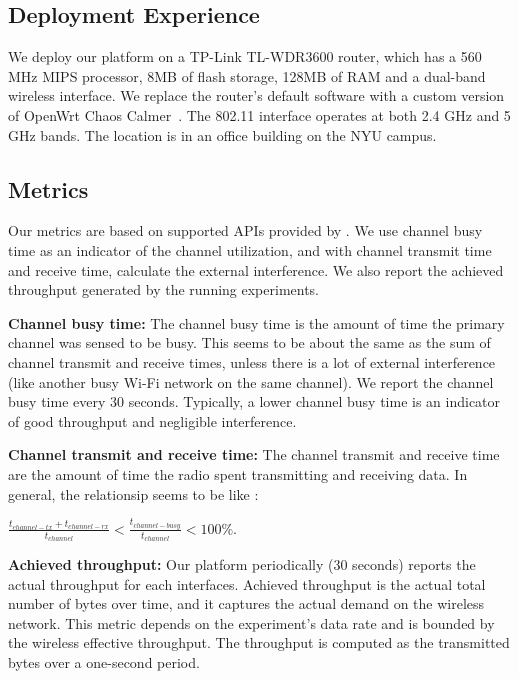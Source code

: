 \subsection{Deployment Experience}
\label{ssec.deployment}
We deploy our platform on a TP-Link TL-WDR3600 router, which has a 560 MHz MIPS processor, 8MB of flash storage, 128MB of RAM and a dual-band wireless interface. We replace the router's default software with a custom version of OpenWrt Chaos Calmer~\cite{openwrt}. The 802.11 interface operates at both 2.4 GHz and 5 GHz bands. The location is in an office building on the NYU campus.

\subsection{Metrics}
\label{ssec.metrics}

Our metrics are based on supported APIs provided by \sysname. We use channel busy time as an indicator of the channel utilization, and with channel transmit time and receive time, calculate the external interference. We also report the achieved throughput generated by the running experiments.

\textbf{Channel busy time:} The channel busy time is the amount of time the primary channel was sensed to be busy. This seems to be about the same as the sum of channel transmit and receive times, unless there is a lot of external interference (like another busy Wi-Fi network on the same channel)\cite{channelsurvey}. We report the channel busy time every 30 seconds. Typically, a lower channel busy time is an indicator of good throughput and negligible interference.

\textbf{Channel transmit and receive time:} The channel transmit and receive time are the amount of time the radio spent transmitting and receiving data. In general, the relationsip seems to be like \cite{cfg80211}:

\(\frac{t_{channel-tx} + t_{channel-rx}}{t_{channel}} < \frac{t_{channel-busy}}{t_{channel}} < 100\%\).

\textbf{Achieved throughput:} Our platform periodically (30 seconds) reports the actual throughput for each interfaces. Achieved throughput is the actual total number of bytes over time, and it captures the actual demand on the wireless network. This metric depends on the experiment's data rate and is bounded by the wireless effective throughput. The throughput is computed as the transmitted bytes over a one-second period.


